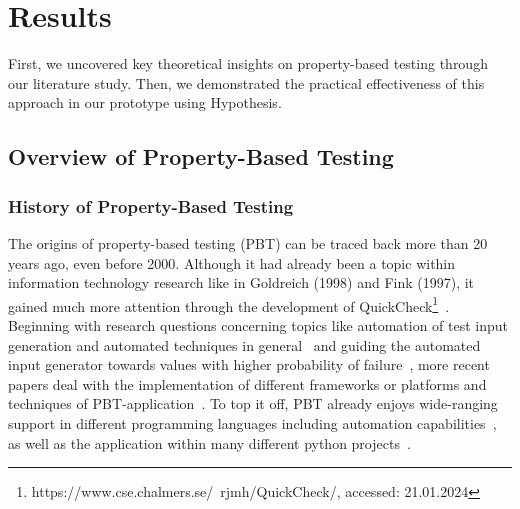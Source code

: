 \documentclass[runningheads]{llncs}
\begin{document}
\section{Results}
First, we uncovered key theoretical insights on property-based testing through our literature study. Then, we demonstrated the practical effectiveness of this approach in our prototype using Hypothesis.

\subsection{Overview of Property-Based Testing}
\subsubsection{History of Property-Based Testing}
The origins of property-based testing (PBT) can be traced back more than 20 years ago, even before 2000. Although it had already been a topic within information technology research like in Goldreich (1998) and Fink (1997), it gained much more attention through the development of QuickCheck\footnote{https://www.cse.chalmers.se/~rjmh/QuickCheck/, accessed: 21.01.2024}~\cite{Shi2023,Fink1997,MacIver2019,Honarvar2020}. Beginning with research questions concerning topics like automation of test input generation and automated techniques in general~\cite{Fink1997} and guiding the automated input generator towards values with higher probability of failure~\cite{Loescher2017}, more recent papers deal with the implementation of different frameworks or platforms and techniques of PBT-application~\cite{Padhye2019,Honarvar2020,Shi2023,Corgozinho2023}. To top it off, PBT already enjoys wide-ranging support in different programming languages including automation capabilities~\cite{Chen2022,Padhye2019,Honarvar2020,ElazarMittelman2023,Shi2023}, as well as the application within many different python projects~\cite{Corgozinho2023}.
\end{document}
